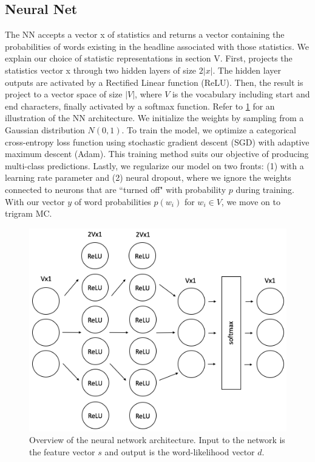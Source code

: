 \documentclass[12pt, journal]{IEEEtran}
\begin{document}
\subsection{Neural Net} 
The NN accepts a vector x of statistics and returns a vector containing the probabilities of words existing in the headline associated with those statistics. We explain our choice of statistic representations in section V. First, projects the statistics vector x through two hidden layers of size $2|x|$. The hidden layer outputs are activated by a Rectified Linear function (ReLU). Then, the result is project to a vector space of size $|V|$, where $V$ is the vocabulary including start and end characters, finally activated by a softmax function. Refer to \ref{NN} for an illustration of the NN architecture. We initialize the weights by sampling from a Gaussian distribution $N(0,1)$. To train the model, we optimize a categorical cross-entropy loss function using stochastic gradient descent (SGD) with adaptive maximum descent (Adam). This training method suits our objective of producing multi-class predictions. Lastly, we regularize our model on two fronts: (1) with a learning rate parameter and (2) neural dropout, where we ignore the weights connected to neurons that are ``turned off" with probability $p$ during training. With our vector $y$ of word probabilities $p(w_i)$ for $w_i \in V$, we move on to trigram MC.

\begin{figure}[h!]
\centering
\includegraphics[width=.6\textwidth]{NN.png}
\caption{Overview of the neural network architecture. Input to the network is the feature vector $s$ and output is the word-likelihood vector $d$.}
\label{NN}
\end{figure}
\end{document}

